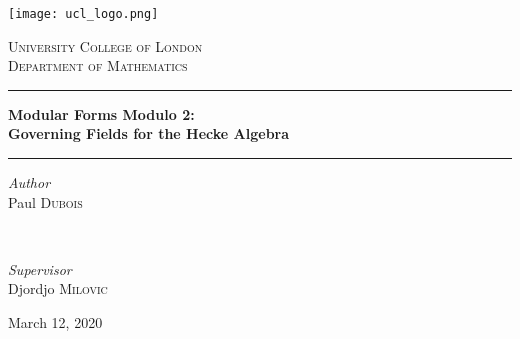 \begin{titlepage}
	\newcommand{\HRule}{\rule{\linewidth}{0.5mm}}
		\begin{center}
		\texttt{[image: ucl\_logo.png]}
		\vspace*{1cm}
		
		\textsc{\LARGE University College of London}\\[0.75cm]
		\textsc{\LARGE Department of Mathematics}
		
		\vspace{1.5cm}
		
		\HRule
%		
		\vspace{0.5cm}
		
		\textbf{\huge Modular Forms Modulo 2:\\}
		\vspace{0.3cm}
		\textbf{\huge Governing Fields for the Hecke Algebra}
		
		\vspace{0.5cm}
		\HRule
		
		\vspace{1.5cm}
		
		\begin{minipage}{0.4\textwidth}
			\begin{flushleft}
				\large
				\textit{Author}\\
				Paul \textsc{Dubois}
			\end{flushleft}
		\end{minipage}
		~
		\begin{minipage}{0.4\textwidth}
			\begin{flushright}
				\large
				\textit{Supervisor}\\
				Djordjo \textsc{Milovic}
			\end{flushright}
		\end{minipage}
		
		\vfill
		
		{\large March 12, 2020} 
	\end{center}
\end{titlepage}
